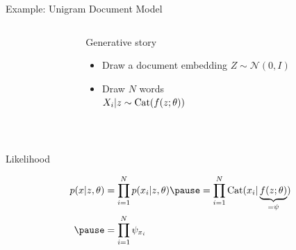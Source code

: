 \begin{frame}{Example: Unigram Document Model}


\begin{columns}
	\begin{column}{0.2\textwidth}
    \end{column}
    \begin{column}{0.75\textwidth}
    	Generative story 
    	\begin{itemize}
			\item Draw a document embedding $Z \sim \mathcal N(0, I)$
			\item Draw $N$ words\\
			$X_i|z \sim \operatorname{Cat}(f(z; \theta))$
		\end{itemize}
    \end{column}
    \end{columns}
    
    
    ~
    
	Likelihood \pause
	\begin{small}
    \begin{equation*}
	\begin{aligned}						
		p(x|z, \theta) &= \prod_{i=1}^N p(x_i|z, \theta) \pause = \prod_{i=1}^N \Cat(x_i|\underbrace{f(z; \theta)}_{=\psi}) \\ \pause
		&= \prod_{i=1}^N \psi_{x_i}
	\end{aligned}
	\end{equation*}
	\end{small}

\end{frame}


